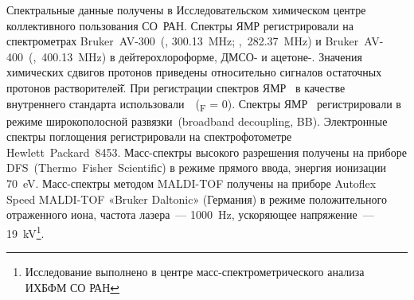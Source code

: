 Спектральные данные получены в Исследовательском химическом центре коллективного пользования СО~РАН.
Спектры ЯМР регистрировали на спектрометрах Bruker~AV-300~(, \SI{300.13}{\mega\hertz}; ,~\SI{282.37}{\mega\hertz}) и Bruker~AV-400~(,~\SI{400.13}{\mega\hertz}) в дейтерохлороформе, \mbox{ДМСО-} и \mbox{ацетоне-}.
Значения химических сдвигов протонов приведены относительно сигналов остаточных протонов растворителей̆.
При регистрации спектров ЯМР~ в качестве внутреннего стандарта использовали~~(\chemdelta{}\textsubscript{F} = \SI{0}{\ppm}).
Спектры ЯМР~ регистрировали в режиме широкополосной развязки~(broadband decoupling, BB).
Электронные спектры поглощения регистрировали на спектрофотометре Hewlett~Packard~8453.
Масс-спектры высокого разрешения получены на приборе DFS~(Thermo~Fisher~Scientifiс) в режиме прямого ввода, энергия ионизации \SI{70}{\electronvolt}.
Масс-спектры методом  MALDI-TOF получены на приборе Autoflex Speed MALDI-TOF «Bruker Daltonic» (Германия) в режиме положительного отраженного иона, частота лазера~–-- \SI{1000}{\hertz}, ускоряющее напряжение~–-- \SI{19}{\kilo\volt}\footnote{Исследование выполнено в центре масс-спектрометрического анализа ИХБФМ СО РАН}.



